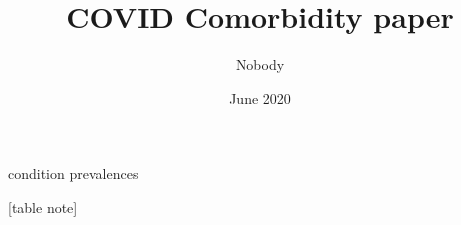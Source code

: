 \documentclass[12pt,letterpaper]{article}
\title{COVID Comorbidity paper} \author{Nobody}
\numberwithin{equation}{section}
\begin{document}
\date{June 2020}


\label{sec:figures}

\begin{table}[H]
  \caption{condition prevalences }
  
  
  \footnotesize{[table note]}
\end{table}
\end{document}
